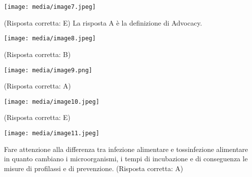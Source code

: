 \documentclass[]{article}
\begin{document}
\texttt{[image: media/image7.jpeg]}

(Risposta corretta: E) La risposta A è la definizione di Advocacy.

\texttt{[image: media/image8.jpeg]}

(Risposta corretta: B)

\texttt{[image: media/image9.png]}

(Risposta corretta: A)

\texttt{[image: media/image10.jpeg]}

(Risposta corretta: E)

\texttt{[image: media/image11.jpeg]}

Fare attenzione alla differenza tra infezione alimentare e tossinfezione
alimentare in quanto cambiano i microorganismi, i tempi di incubazione e
di conseguenza le misure di profilassi e di prevenzione. (Risposta
corretta: A)
\end{document}
